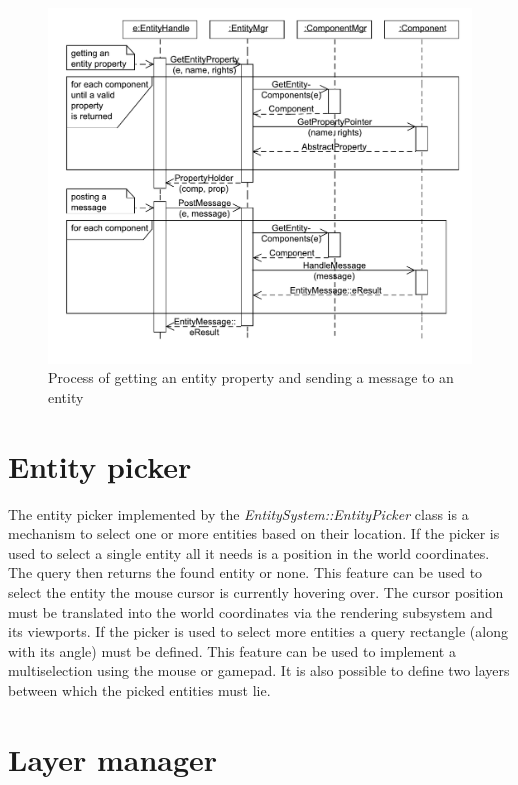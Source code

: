 \documentclass[a4paper, 12pt]{report}
\begin{document}
\begin{figure}[htbp]
	\centering
		\includegraphics[width=1\textwidth]{EntityCommunicationSequence.pdf}
	\caption[The entity communication sequence diagram]{Process of getting an entity property and sending a message to an entity}
	\label{fig:entity-communication-sequence}
\end{figure}

\section{Entity picker}

The entity picker implemented by the \emph{EntitySystem::EntityPicker} class is a mechanism to select one or more entities based on their location. If the picker is used to select a single entity all it needs is a position in the world coordinates. The query then returns the found entity or none. This feature can be used to select the entity the mouse cursor is currently hovering over. The cursor position must be translated into the world coordinates via the rendering subsystem and its viewports. If the picker is used to select more entities a query rectangle (along with its angle) must be defined. This feature can be used to implement a multiselection using the mouse or gamepad. It is also possible to define two layers between which the picked entities must lie.

\section{Layer manager}
\end{document}
